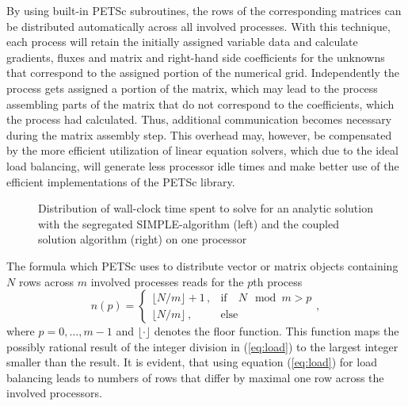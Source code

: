 By using built-in PETSc subroutines, the rows of the corresponding matrices can be distributed automatically across all involved processes. With this technique, each process will retain the initially assigned variable data and calculate gradients, fluxes and matrix and right-hand side coefficients for the unknowns that correspond to the assigned portion of the numerical grid. Independently the process gets assigned a portion of the matrix, which may lead to the process assembling parts of the matrix that do not correspond to the coefficients, which the process had calculated. Thus, additional communication becomes necessary during the matrix assembly step. This overhead may, however, be compensated by the more efficient utilization of linear equation solvers, which due to the ideal load balancing, will generate less processor idle times and make better use of the efficient implementations of the PETSc library.

\begin{figure}[!h]
  \centering
  \begin{minipage}{0.45\textwidth}
\hfil
\end{minipage}
  \begin{minipage}{0.45\textwidth}
\end{minipage}
\caption{Distribution of wall-clock time spent to solve for an analytic solution with the segregated SIMPLE-algorithm (left) and the coupled solution algorithm (right) on one processor}
\label{fig:barbalance}
\end{figure}

The formula which PETSc uses to distribute vector or matrix objects containing \(N\) rows across \(m\) involved processes reads for the \(p\)th process
\begin{equation}
  \label{eq:load}
n(p)
=
\left\{\begin{array}{ll} 
    \lfloor N/m \rfloor + 1\,, & \text{if} \quad  N \mod m > p \\
    \lfloor N/m \rfloor \,, & \text{else}
\end{array}\right.
,
\end{equation}
where \(p = 0,\dots,m-1\) and \(\lfloor \cdot \rfloor\) denotes the floor function. This function maps the possibly rational result of the integer division in (\ref{eq:load}) to the largest integer smaller than the result. It is evident, that using equation (\ref{eq:load}) for load balancing leads to numbers of rows that differ by maximal one row across the involved processors.

